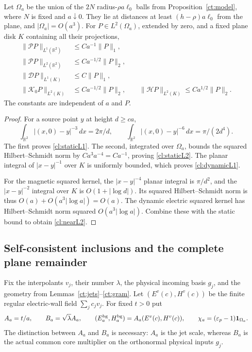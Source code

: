 \begin{lemma}
\label{cl:planebounds}
Let $\Omega_a$ be the union of the $2N$ radius-$\rho a\ell_0$
balls from Proposition~\ref{ct:model}, where $N$ is fixed and
$a\downarrow0$. They lie at distances at least
$(h-\rho)a\ell_0$ from the plane, and $|\Omega_a|=O(a^3)$.
For $P\in L^2(\Omega_a)$, extended by zero, and a fixed plane
disk $K$ containing all their projections,
\begin{align}
 \|\mathcal P P\|_{L^1(\mathbb R^2)}
       &\leq C a^{-1}\|P\|_1,\label{cl:staticL1}\\
 \|\mathcal P P\|_{L^2(\mathbb R^2)}
       &\leq C a^{-1/2}\|P\|_2,\label{cl:staticL2}\\
 \|\mathcal D P\|_{L^1(K)}
       &\leq C\|P\|_1,\label{cl:dynamicL1}\\
 \|\mathcal K_0P\|_{L^2(K)}
       &\leq C a^{-1/2}\|P\|_2,\qquad
 \|\mathcal HP\|_{L^2(K)}
       \leq C a^{1/2}\|P\|_2.\label{cl:nearL2}
\end{align}
The constants are independent of $a$ and $P$.
\end{lemma}
\begin{proof}
For a source point $y$ at height $d\geq c a$,
\[
 \int_{\mathbb R^2}|(x,0)-y|^{-3}\,dx=2\pi/d,
 \qquad
 \int_{\mathbb R^2}|(x,0)-y|^{-6}\,dx=\pi/(2d^4).
\]
The first proves \eqref{cl:staticL1}. The second, integrated over
$\Omega_a$, bounds the squared Hilbert--Schmidt norm by
$C a^3a^{-4}=C a^{-1}$, proving \eqref{cl:staticL2}.
The planar integral of $|x-y|^{-1}$ over $K$ is uniformly bounded,
which proves \eqref{cl:dynamicL1}.

For the magnetic squared kernel, the $|x-y|^{-4}$ planar
integral is $\pi/d^2$, and the $|x-y|^{-2}$ integral over $K$
is $O(1+|\log d|)$. Its squared Hilbert--Schmidt norm is thus
$O(a)+O(a^3|\log a|)=O(a)$. The dynamic electric squared
kernel has Hilbert--Schmidt norm squared $O(a^3|\log a|)$.
Combine these with the static bound to obtain \eqref{cl:nearL2}.
\end{proof}

\subsection{Self-consistent inclusions and the complete plane remainder}

Fix the interpolants $v_j$, their number $\lambda$, the physical
incoming basis $g_j$, and the geometry from
Lemmas~\ref{ct:jets}--\ref{ct:gram}. Let
$(E^v(c),H^v(c))$ be the finite regular electric-wall field
$\sum_jc_jv_j$. For fixed $t>0$ put
\begin{equation}\label{cl:scales}
 A_a=t/a,\qquad B_a=\sqrt\lambda A_a,\qquad
 (E^{\rm bg}_a,H^{\rm bg}_a)=A_a(E^v(c),H^v(c)),\qquad
 \chi_a=(\varepsilon_p-1)\mathbf1_{\Omega_a}.
\end{equation}
The distinction between $A_a$ and $B_a$ is necessary: $A_a$ is
the jet scale, whereas $B_a$ is the actual common core multiplier
on the orthonormal physical inputs $g_j$.

